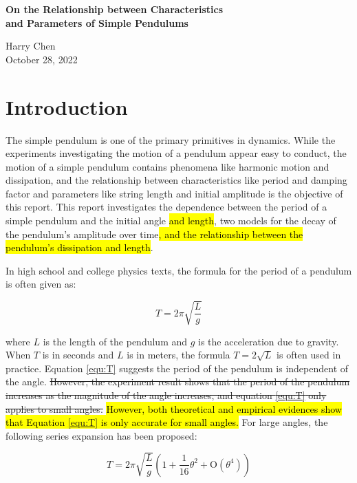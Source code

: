 \documentclass[12pt]{article}
\DeclareRobustCommand{\hlnew}[1]{{\sethlcolor{hlcnew}\hl{#1}}}
\DeclareRobustCommand{\hldel}[1]{{\st{#1}}}
\begin{document}
\begin{center}

\bf{\LARGE
On the Relationship between Characteristics \\ and Parameters of Simple Pendulums
}

\rm{\large
Harry Chen\\
October 28, 2022
}

\end{center}


\section{Introduction}

The simple pendulum is one of the primary primitives in dynamics. While the experiments investigating the motion of a pendulum appear easy to conduct, the motion of a simple pendulum contains phenomena like harmonic motion and dissipation, and the relationship between characteristics like period and damping factor and parameters like string length and initial amplitude is the objective of this report. This report investigates the dependence between the period of a simple pendulum and the initial angle \hlnew{and length}, two models for the decay of the pendulum's amplitude over time\hlnew{, and the relationship between the pendulum's dissipation and length}.

In high school and college physics texts, the formula for the period of a pendulum is often given as: ~\cite{openstax-physics}

\begin{equation}
\label{equ:T}
T=2\pi\sqrt{\frac{L}{g}}
\end{equation}

where $L$ is the length of the pendulum and $g$ is the acceleration due to gravity. When $T$ is in seconds and $L$ is in meters, the formula $T=2\sqrt{L}$ is often used in practice. Equation \ref{equ:T} suggests the period of the pendulum is independent of the angle. \hldel{However, the experiment result shows that the period of the pendulum increases as the magnitude of the angle increases, and equation {\ref{equ:T}} only applies to small angles.} \hlnew{However, both theoretical and empirical evidences show that Equation {\ref{equ:T}} is only accurate for small angles.} For large angles, the following series expansion has been proposed: ~\cite{hyperphysics-pendl}

\begin{equation}
\label{equ:T1}
T=2\pi\sqrt{\frac{L}{g}}\left(1+\frac{1}{16}\theta^2+\mathrm{O}\left(\theta^4\right)\right)
\end{equation}
\end{document}
